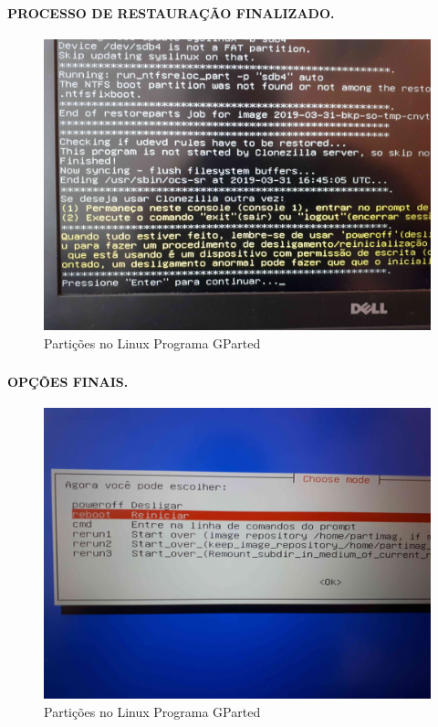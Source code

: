 \documentclass{beamer}
\begin{document}
\begin{frame}[plain,c]
   \frametitle{\insertsection}
    \framesubtitle{PROCESSO DE RESTAURAÇÃO FINALIZADO.}
    \begin{figure}[!h]
        \includegraphics[width=1\linewidth]{images/rest/res21.jpg}
        \caption{Partições no Linux Programa GParted}
    \end{figure}
\end{frame}

\begin{frame}[plain,c]
   \frametitle{\insertsection}
    \framesubtitle{OPÇÕES FINAIS.}
    \begin{figure}[!h]
        \includegraphics[width=1\linewidth]{images/rest/res22.jpg}
        \caption{Partições no Linux Programa GParted}
    \end{figure}
\end{frame}
		
\end{document}
